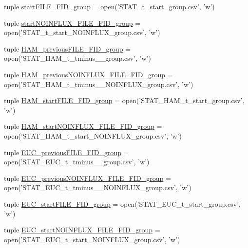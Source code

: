 \begin{DoxyCompactItemize}
\item 
tuple \hyperlink{a00098_addede16e21598cc53c446efa66bd20d9}{start\-F\-I\-L\-E\-\_\-\-F\-I\-D\-\_\-group} = open('S\-T\-A\-T\-\_\-t\-\_\-start\-\_\-group.\-csv', 'w')
\item 
tuple \hyperlink{a00098_a14eebfeaac72a017ee76d69b55033042}{start\-N\-O\-I\-N\-F\-L\-U\-X\-\_\-\-F\-I\-L\-E\-\_\-\-F\-I\-D\-\_\-group} = open('S\-T\-A\-T\-\_\-t\-\_\-start\-\_\-\-N\-O\-I\-N\-F\-L\-U\-X\-\_\-group.\-csv', 'w')
\item 
tuple \hyperlink{a00098_aa72272e636b1eafe39ed3367145433f2}{H\-A\-M\-\_\-previous\-F\-I\-L\-E\-\_\-\-F\-I\-D\-\_\-group} = open('S\-T\-A\-T\-\_\-\-H\-A\-M\-\_\-t\-\_\-tminus\-\_\-\_\-group.\-csv', 'w')
\item 
tuple \hyperlink{a00098_a092676cc95ddff57aac2aa077ce22d52}{H\-A\-M\-\_\-previous\-N\-O\-I\-N\-F\-L\-U\-X\-\_\-\-F\-I\-L\-E\-\_\-\-F\-I\-D\-\_\-group} = open('S\-T\-A\-T\-\_\-\-H\-A\-M\-\_\-t\-\_\-tminus\-\_\-\_\-\-N\-O\-I\-N\-F\-L\-U\-X\-\_\-group.\-csv', 'w')
\item 
tuple \hyperlink{a00098_ab74ecb2bab6a84c44274814862f2e96c}{H\-A\-M\-\_\-start\-F\-I\-L\-E\-\_\-\-F\-I\-D\-\_\-group} = open('S\-T\-A\-T\-\_\-\-H\-A\-M\-\_\-t\-\_\-start\-\_\-group.\-csv', 'w')
\item 
tuple \hyperlink{a00098_a4652c6dad393663e40970d7f6422c1d6}{H\-A\-M\-\_\-start\-N\-O\-I\-N\-F\-L\-U\-X\-\_\-\-F\-I\-L\-E\-\_\-\-F\-I\-D\-\_\-group} = open('S\-T\-A\-T\-\_\-\-H\-A\-M\-\_\-t\-\_\-start\-\_\-\-N\-O\-I\-N\-F\-L\-U\-X\-\_\-group.\-csv', 'w')
\item 
tuple \hyperlink{a00098_adf079c2d443f89f00a330a58f99c2095}{E\-U\-C\-\_\-previous\-F\-I\-L\-E\-\_\-\-F\-I\-D\-\_\-group} = open('S\-T\-A\-T\-\_\-\-E\-U\-C\-\_\-t\-\_\-tminus\-\_\-\_\-group.\-csv', 'w')
\item 
tuple \hyperlink{a00098_ace5cf628b305f9110e058d7dafd27fb4}{E\-U\-C\-\_\-previous\-N\-O\-I\-N\-F\-L\-U\-X\-\_\-\-F\-I\-L\-E\-\_\-\-F\-I\-D\-\_\-group} = open('S\-T\-A\-T\-\_\-\-E\-U\-C\-\_\-t\-\_\-tminus\-\_\-\_\-\-N\-O\-I\-N\-F\-L\-U\-X\-\_\-group.\-csv', 'w')
\item 
tuple \hyperlink{a00098_abe1a2acadc97e46d55c6f4164c0890dc}{E\-U\-C\-\_\-start\-F\-I\-L\-E\-\_\-\-F\-I\-D\-\_\-group} = open('S\-T\-A\-T\-\_\-\-E\-U\-C\-\_\-t\-\_\-start\-\_\-group.\-csv', 'w')
\item 
tuple \hyperlink{a00098_aef08a333d5fed02e90483cc87e389ed0}{E\-U\-C\-\_\-start\-N\-O\-I\-N\-F\-L\-U\-X\-\_\-\-F\-I\-L\-E\-\_\-\-F\-I\-D\-\_\-group} = open('S\-T\-A\-T\-\_\-\-E\-U\-C\-\_\-t\-\_\-start\-\_\-\-N\-O\-I\-N\-F\-L\-U\-X\-\_\-group.\-csv', 'w')

\end{DoxyCompactItemize}
